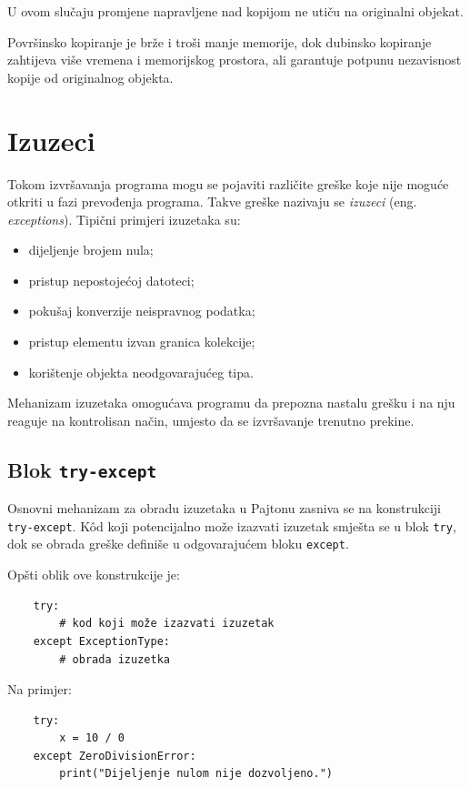 U ovom slučaju promjene napravljene nad kopijom ne utiču na originalni objekat.

\bigskip

Površinsko kopiranje je brže i troši manje memorije, dok dubinsko kopiranje zahtijeva više vremena i memorijskog prostora, ali garantuje potpunu nezavisnost kopije od originalnog objekta.
  

\section{Izuzeci}

Tokom izvršavanja programa mogu se pojaviti različite greške koje nije moguće otkriti u fazi prevođenja programa. Takve greške nazivaju se \textit{izuzeci} (eng. \textit{exceptions}). Tipični primjeri izuzetaka su:

\begin{itemize}
	\item dijeljenje brojem nula;
	\item pristup nepostojećoj datoteci;
	\item pokušaj konverzije neispravnog podatka;
	\item pristup elementu izvan granica kolekcije;
	\item korištenje objekta neodgovarajućeg tipa.
\end{itemize}

Mehanizam izuzetaka omogućava programu da prepozna nastalu grešku i na nju reaguje na kontrolisan način, umjesto da se izvršavanje trenutno prekine.

\subsection{Blok \texttt{try-except}}

Osnovni mehanizam za obradu izuzetaka u Pajtonu zasniva se na konstrukciji \texttt{try-except}. K\^od koji potencijalno može izazvati izuzetak smješta se u blok \texttt{try}, dok se obrada greške definiše u odgovarajućem bloku \texttt{except}.

Opšti oblik ove konstrukcije je:

\begin{verbatim}
	try:
	    # kod koji može izazvati izuzetak
	except ExceptionType:
	    # obrada izuzetka
\end{verbatim}

Na primjer:

\begin{verbatim}
	try:
	    x = 10 / 0
	except ZeroDivisionError:
	    print("Dijeljenje nulom nije dozvoljeno.")
\end{verbatim}

